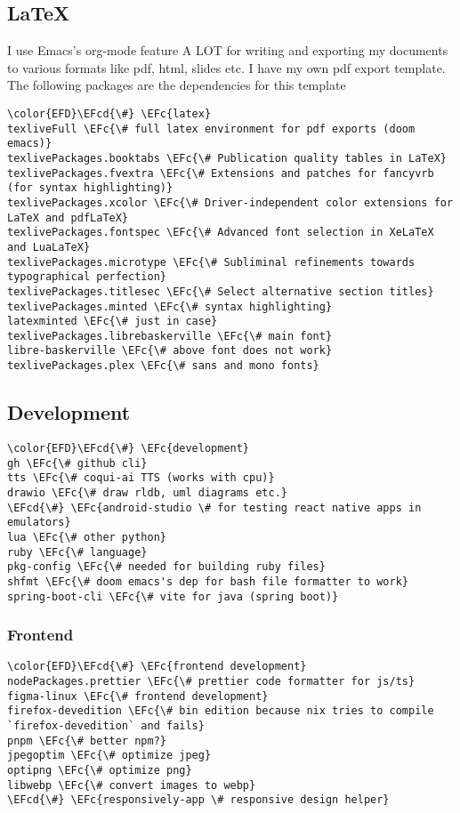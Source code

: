 \documentclass[14pt]{article}
\newcommand{\EFc}[1]{\textcolor{EFc}{#1}} %
\newcommand{\EFcd}[1]{\textcolor{EFcd}{#1}} %
\begin{document}
\subsection{\LaTeX{}}
\label{sec:orge20e148}
I use Emacs's org-mode feature A LOT for writing and exporting my documents to various formats like pdf, html, slides etc. I have my own pdf export template. The following packages are the dependencies for this template
\begin{Code}
\begin{Verbatim}
\color{EFD}\EFcd{\#} \EFc{latex}
texliveFull \EFc{\# full latex environment for pdf exports (doom emacs)}
texlivePackages.booktabs \EFc{\# Publication quality tables in LaTeX}
texlivePackages.fvextra \EFc{\# Extensions and patches for fancyvrb (for syntax highlighting)}
texlivePackages.xcolor \EFc{\# Driver-independent color extensions for LaTeX and pdfLaTeX}
texlivePackages.fontspec \EFc{\# Advanced font selection in XeLaTeX and LuaLaTeX}
texlivePackages.microtype \EFc{\# Subliminal refinements towards typographical perfection}
texlivePackages.titlesec \EFc{\# Select alternative section titles}
texlivePackages.minted \EFc{\# syntax highlighting}
latexminted \EFc{\# just in case}
texlivePackages.librebaskerville \EFc{\# main font}
libre-baskerville \EFc{\# above font does not work}
texlivePackages.plex \EFc{\# sans and mono fonts}
\end{Verbatim}
\end{Code}
\subsection{Development}
\label{sec:org106c12e}
\begin{Code}
\begin{Verbatim}
\color{EFD}\EFcd{\#} \EFc{development}
gh \EFc{\# github cli}
tts \EFc{\# coqui-ai TTS (works with cpu)}
drawio \EFc{\# draw rldb, uml diagrams etc.}
\EFcd{\#} \EFc{android-studio \# for testing react native apps in emulators}
lua \EFc{\# other python}
ruby \EFc{\# language}
pkg-config \EFc{\# needed for building ruby files}
shfmt \EFc{\# doom emacs's dep for bash file formatter to work}
spring-boot-cli \EFc{\# vite for java (spring boot)}

\end{Verbatim}
\end{Code}
\subsubsection{Frontend}
\label{sec:orgdb73a56}
\begin{Code}
\begin{Verbatim}
\color{EFD}\EFcd{\#} \EFc{frontend development}
nodePackages.prettier \EFc{\# prettier code formatter for js/ts}
figma-linux \EFc{\# frontend development}
firefox-devedition \EFc{\# bin edition because nix tries to compile `firefox-devedition` and fails}
pnpm \EFc{\# better npm?}
jpegoptim \EFc{\# optimize jpeg}
optipng \EFc{\# optimize png}
libwebp \EFc{\# convert images to webp}
\EFcd{\#} \EFc{responsively-app \# responsive design helper}

\end{Verbatim}
\end{Code}
\end{document}
